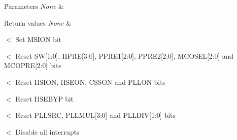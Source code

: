 \begin{DoxyParams}{Parameters}
{\em None} & \\
\hline
\end{DoxyParams}

\begin{DoxyRetVals}{Return values}
{\em None} & \\
\hline
\end{DoxyRetVals}
$<$ Set M\-S\-I\-O\-N bit

$<$ Reset S\-W\mbox{[}1\-:0\mbox{]}, H\-P\-R\-E\mbox{[}3\-:0\mbox{]}, P\-P\-R\-E1\mbox{[}2\-:0\mbox{]}, P\-P\-R\-E2\mbox{[}2\-:0\mbox{]}, M\-C\-O\-S\-E\-L\mbox{[}2\-:0\mbox{]} and M\-C\-O\-P\-R\-E\mbox{[}2\-:0\mbox{]} bits

$<$ Reset H\-S\-I\-O\-N, H\-S\-E\-O\-N, C\-S\-S\-O\-N and P\-L\-L\-O\-N bits

$<$ Reset H\-S\-E\-B\-Y\-P bit

$<$ Reset P\-L\-L\-S\-R\-C, P\-L\-L\-M\-U\-L\mbox{[}3\-:0\mbox{]} and P\-L\-L\-D\-I\-V\mbox{[}1\-:0\mbox{]} bits

$<$ Disable all interrupts 